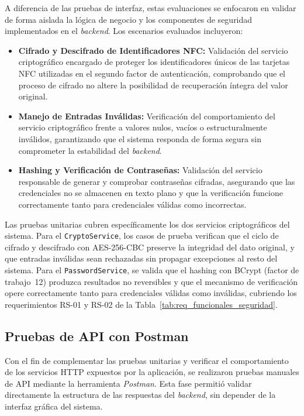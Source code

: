 A diferencia de las pruebas de interfaz, estas evaluaciones se enfocaron en validar de forma aislada la lógica de negocio y los componentes de seguridad implementados en el \textit{backend}. Los escenarios evaluados incluyeron:
\begin{itemize}
	\item \textbf{Cifrado y Descifrado de Identificadores NFC:} Validación del servicio criptográfico encargado de proteger los identificadores únicos de las tarjetas NFC utilizadas en el segundo factor de autenticación, comprobando que el proceso de cifrado no altere la posibilidad de recuperación íntegra del valor original.
	\item \textbf{Manejo de Entradas Inválidas:} Verificación del comportamiento del servicio criptográfico frente a valores nulos, vacíos o estructuralmente inválidos, garantizando que el sistema responda de forma segura sin comprometer la estabilidad del \textit{backend}.
	\item \textbf{Hashing y Verificación de Contraseñas:} Validación del servicio responsable de generar y comprobar contraseñas cifradas, asegurando que las credenciales no se almacenen en texto plano y que la verificación funcione correctamente tanto para credenciales válidas como incorrectas.
\end{itemize}
Las pruebas unitarias cubren específicamente los dos servicios criptográficos 
del sistema. Para el \texttt{CryptoService}, los casos de prueba verifican que 
el ciclo de cifrado y descifrado con AES-256-CBC preserve la integridad del dato 
original, y que entradas inválidas sean rechazadas sin propagar excepciones al 
resto del sistema. Para el \texttt{PasswordService}, se valida que el hashing 
con BCrypt (factor de trabajo~12) produzca resultados no reversibles y que el 
mecanismo de verificación opere correctamente tanto para credenciales válidas 
como inválidas, cubriendo los requerimientos RS-01 y RS-02 de la 
Tabla~\ref{tab:req_funcionales_seguridad}.

\subsection{Pruebas de API con Postman}

Con el fin de complementar las pruebas unitarias y verificar el comportamiento de los servicios HTTP expuestos por la aplicación, se realizaron pruebas manuales de API mediante la herramienta \textit{Postman}. Esta fase permitió validar directamente la estructura de las respuestas del \textit{backend}, sin depender de la interfaz gráfica del sistema.


